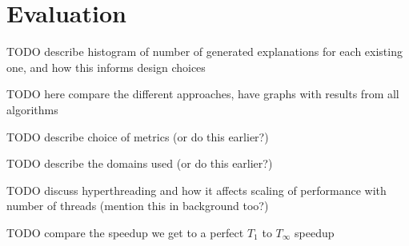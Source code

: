 \chapter{Evaluation}

TODO describe histogram of number of generated explanations for each existing one, and how this informs design choices

TODO here compare the different approaches, have graphs with results from all algorithms

TODO describe choice of metrics (or do this earlier?)

TODO describe the domains used (or do this earlier?)

TODO discuss hyperthreading and how it affects scaling of performance with number of threads (mention this in background too?)

TODO compare the speedup we get to a perfect $T_1$ to $T_\infty$ speedup
